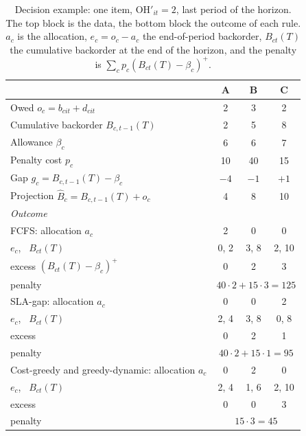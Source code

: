\documentclass[11pt, a4paper]{article}
\theoremstyle{definition}
\theoremstyle{remark}
\newcommand{\OH}{\text{OH}}
\begin{document}
\begin{table}[H]
    \centering
    \caption{Decision example: one item, $\OH'_{it} = 2$, last period of the horizon. The top block is the data, the bottom block the outcome of each rule. $a_c$ is the allocation, $e_c = o_c - a_c$ the end-of-period backorder, $B_{ct}(T)$ the cumulative backorder at the end of the horizon, and the penalty is $\sum_c p_c (B_{ct}(T) - \beta_c)^+$.}
    \label{tab:decision-example}
    \begin{tabular}{lccc}
        \toprule
        & A & B & C \\
        \midrule
        Owed $o_c = b_{cit} + d_{cit}$ & 2 & 3 & 2 \\
        Cumulative backorder $B_{c,t-1}(T)$ & 2 & 5 & 8 \\
        Allowance $\beta_c$ & 6 & 6 & 7 \\
        Penalty cost $p_c$ & 10 & 40 & 15 \\
        Gap $g_c = B_{c,t-1}(T) - \beta_c$ & $-4$ & $-1$ & $+1$ \\
        Projection $\widehat{B}_c = B_{c,t-1}(T) + o_c$ & 4 & 8 & 10 \\
        \midrule
        \multicolumn{4}{l}{\textit{Outcome}} \\
        FCFS: allocation $a_c$ & 2 & 0 & 0 \\
        \quad $e_c$, \ $B_{ct}(T)$ & 0, 2 & 3, 8 & 2, 10 \\
        \quad excess $(B_{ct}(T) - \beta_c)^+$ & 0 & 2 & 3 \\
        \quad penalty & \multicolumn{3}{c}{$40 \cdot 2 + 15 \cdot 3 = 125$} \\
        SLA-gap: allocation $a_c$ & 0 & 0 & 2 \\
        \quad $e_c$, \ $B_{ct}(T)$ & 2, 4 & 3, 8 & 0, 8 \\
        \quad excess & 0 & 2 & 1 \\
        \quad penalty & \multicolumn{3}{c}{$40 \cdot 2 + 15 \cdot 1 = 95$} \\
        Cost-greedy and greedy-dynamic: allocation $a_c$ & 0 & 2 & 0 \\
        \quad $e_c$, \ $B_{ct}(T)$ & 2, 4 & 1, 6 & 2, 10 \\
        \quad excess & 0 & 0 & 3 \\
        \quad penalty & \multicolumn{3}{c}{$15 \cdot 3 = 45$} \\
        \bottomrule
    \end{tabular}
\end{table}
\end{document}

